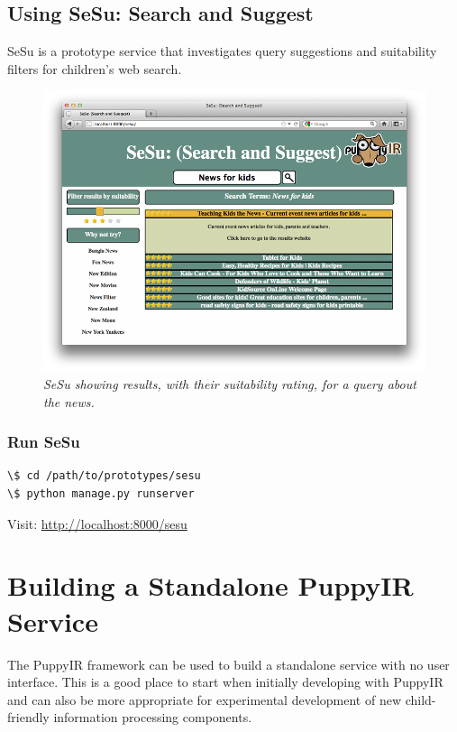 \documentclass[letterpaper,10pt,english]{sphinxmanual}
\begin{document}
\subsection{Using SeSu: Search and Suggest}
\label{prototypes:using-sesu-search-and-suggest}
SeSu is a prototype service that investigates query suggestions and suitability filters for children's web search.
\begin{figure}[htbp]
\centering
\capstart

\includegraphics{puppy-sesu.png}
\caption{\emph{SeSu showing results, with their suitability rating, for a query about the news.}}\end{figure}


\subsubsection{Run SeSu}
\label{prototypes:run-sesu}
\begin{Verbatim}[commandchars=\\\{\}]
\$ cd /path/to/prototypes/sesu
\$ python manage.py runserver
\end{Verbatim}

Visit: \href{http://localhost:8000/sesu}{http://localhost:8000/sesu}


\section{Building a Standalone PuppyIR Service}
\label{standalone-service::doc}\label{standalone-service:building-a-standalone-puppyir-service}\label{standalone-service:id1}
The PuppyIR framework can be used to build a standalone service with no user interface. This is a good place to start when initially developing with PuppyIR and can also be more appropriate for experimental development of new child-friendly information processing components.
\end{document}
